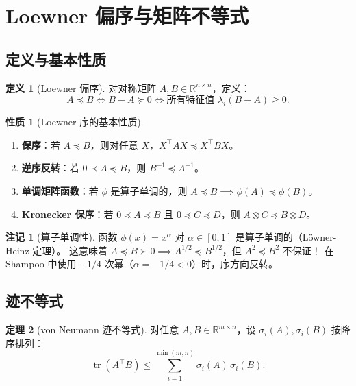 \documentclass[12pt,a4paper]{ctexart}
\theoremstyle{definition}
\newtheorem{definition}{定义}[section]
\newtheorem{theorem}{定理}[section]
\newtheorem{property}[theorem]{性质}
\newtheorem{remark}{注记}[section]
\theoremstyle{plain}
\newcommand{\R}{\mathbb{R}}
\newcommand{\tr}{\operatorname{tr}}
\begin{document}
\section{Loewner 偏序与矩阵不等式}

\subsection{定义与基本性质}

\begin{definition}[Loewner 偏序]
  对对称矩阵 $A,B\in\R^{n\times n}$，定义：
  \[
    A\preceq B \iff B-A \succeq 0 \iff \text{所有特征值 } \lambda_i(B-A)\ge0.
  \]
\end{definition}

\begin{property}[Loewner 序的基本性质]
  \begin{enumerate}[label=(\arabic*)]
    \item \textbf{保序}：若 $A\preceq B$，则对任意 $X$，$X^\top AX\preceq X^\top BX$。
    \item \textbf{逆序反转}：若 $0\prec A\preceq B$，则 $B^{-1}\preceq A^{-1}$。
    \item \textbf{单调矩阵函数}：若 $\phi$ 是算子单调的，则 $A\preceq B\implies\phi(A)\preceq\phi(B)$。
    \item \textbf{Kronecker 保序}：若 $0\preceq A\preceq B$ 且 $0\preceq C\preceq D$，则 $A\otimes C\preceq B\otimes D$。
  \end{enumerate}
\end{property}

\begin{remark}[算子单调性]
  函数 $\phi(x)=x^\alpha$ 对 $\alpha\in[0,1]$ 是算子单调的（Löwner-Heinz 定理）。
  这意味着 $A\preceq B\succ0 \implies A^{1/2}\preceq B^{1/2}$，但 $A^2\preceq B^2$ 不保证！
  在 Shampoo 中使用 $-1/4$ 次幂（$\alpha=-1/4<0$）时，序方向反转。
\end{remark}

\subsection{迹不等式}

\begin{theorem}[von Neumann 迹不等式]
  对任意 $A,B\in\R^{m\times n}$，设 $\sigma_i(A),\sigma_i(B)$ 按降序排列：
  \begin{equation}
    \tr(A^\top B) \le \sum_{i=1}^{\min(m,n)} \sigma_i(A)\,\sigma_i(B).
  \end{equation}
\end{theorem}
\end{document}
